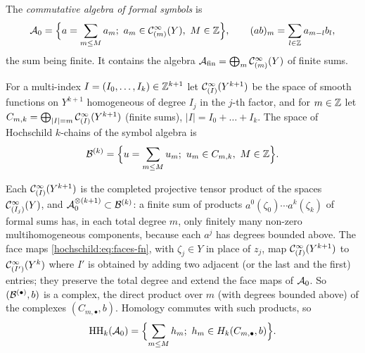 The \emph{commutative algebra of formal symbols} is
\begin{equation*}
  \cA_0=\Bigl\{a=\sum_{m\le M}a_m;\ a_m\in\CI_{(m)}(Y),\ M\in\Z\Bigr\},\qquad
  (ab)_m=\sum_{l\in\Z}a_{m-l}b_l,
\end{equation*}
the sum being finite. It contains the algebra
$\mathcal{A}_{\mathrm{fin}}=\bigoplus_m\mathcal{C}^\infty_{(m)}(Y)$ of finite sums.

\begin{definition}\label{hochschild:def:chains-comm}
For a multi-index $I=(I_0,\dots,I_k)\in\mathbb{Z}^{k+1}$ let $\mathcal{C}^\infty_{(I)}(Y^{k+1})$ be the
space of smooth functions on $Y^{k+1}$ homogeneous of degree $I_j$ in the
$j$-th factor, and for $m\in\mathbb{Z}$ let $C_{m,k}=\bigoplus_{|I|=m}\mathcal{C}^\infty_{(I)}(Y^{k+1})$
(finite sums), $|I|=I_0+\dots+I_k$. The space of Hochschild $k$-chains of the
symbol algebra is
\begin{equation*}
  \mathcal{B}^{(k)}=\Bigl\{u=\sum_{m\le M}u_m;\ u_m\in C_{m,k},\ M\in\mathbb{Z}\Bigr\}.
\end{equation*}
\end{definition}

Each $\mathcal{C}^\infty_{(I)}(Y^{k+1})$ is the completed projective tensor product of the
spaces $\mathcal{C}^\infty_{(I_j)}(Y)$, and $\mathcal{A}_0^{\otimes(k+1)}\subset\mathcal{B}^{(k)}$: a finite
sum of products $a^0(\zeta_0)\cdots a^k(\zeta_k)$ of formal sums has, in each
total degree $m$, only finitely many non-zero multihomogeneous components,
because each $a^j$ has degrees bounded above. The face maps
\eqref{hochschild:eq:faces-fn}, with $\zeta_j\in Y$ in place of $z_j$, map
$\mathcal{C}^\infty_{(I)}(Y^{k+1})$ to $\mathcal{C}^\infty_{(I')}(Y^k)$ where $I'$ is obtained by adding two
adjacent (or the last and the first) entries; they preserve the total degree
and extend the face maps of $\mathcal{A}_0$. So $(\mathcal{B}^{(\bullet)},b)$ is a complex,
the direct product over $m$ (with degrees bounded above) of the complexes
$(C_{m,\bullet},b)$. Homology commutes with such products, so
\begin{equation}
  \operatorname{HH}_k(\mathcal{A}_0)=\Bigl\{\sum_{m\le M}h_m;\ h_m\in H_k(C_{m,\bullet},b)\Bigr\}.
  \label{hochschild:eq:product}
\end{equation}

